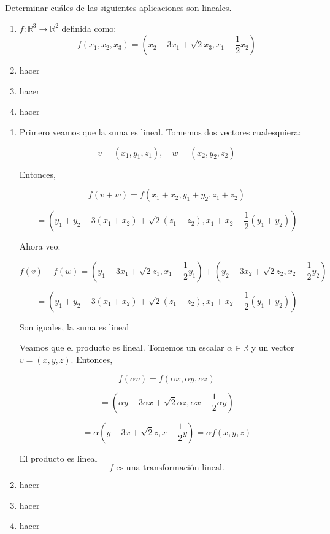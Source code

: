 \begin{enunciado}{\ejercicio}
  Determinar cuáles de las siguientes aplicaciones son lineales.
  \begin{enumerate}[label=(\alph*)]
  \item $f: \mathbb{R}^3 \to \mathbb{R}^2$ definida como:   \[
    f(x_1, x_2, x_3) = (x_2 - 3x_1 + \sqrt{2}x_3, x_1 - \frac{1}{2} x_2)
    \]
  \item hacer
  \item hacer
  \item hacer

  \end{enumerate}
\end{enunciado}

\begin{enumerate}[label=(\alph*)]
  \item
  Primero veamos que la suma es lineal. Tomemos dos vectores cualesquiera: 
  
  \[
  v = (x_1, y_1, z_1), \quad w = (x_2, y_2, z_2)
  \]
  
  Entonces,
  
  \[
  f(v + w) = f(x_1 + x_2, y_1 + y_2, z_1 + z_2)
  \]
  
  \[
  = (y_1 + y_2 - 3(x_1 + x_2) + \sqrt{2} (z_1 + z_2), x_1 + x_2 - \frac{1}{2} (y_1 + y_2))
  \]
  
  Ahora veo:
  
  \[
  f(v) + f(w) = (y_1 - 3x_1 + \sqrt{2} z_1, x_1 - \frac{1}{2} y_1) + (y_2 - 3x_2 + \sqrt{2} z_2, x_2 - \frac{1}{2} y_2)
  \]
  
  \[
  = (y_1 + y_2 - 3(x_1 + x_2) + \sqrt{2} (z_1 + z_2), x_1 + x_2 - \frac{1}{2} (y_1 + y_2))
  \]
  
  Son iguales, la suma es lineal
  
  Veamos que el producto es lineal. Tomemos un escalar $\alpha \in \mathbb{R}$ y un vector $v = (x, y, z)$. Entonces,
  
  \[
  f(\alpha v) = f(\alpha x, \alpha y, \alpha z)
  \]
  
  \[
  = (\alpha y - 3\alpha x + \sqrt{2} \alpha z, \alpha x - \frac{1}{2} \alpha y)
  \]
  
  \[
  = \alpha (y - 3x + \sqrt{2}z, x - \frac{1}{2} y) = \alpha f(x, y, z)
  \]
  
  El producto es lineal
  \[
  f \text{ es una transformación lineal.}
  \]
  \item hacer
  \item hacer
  \item hacer

\end{enumerate}

\begin{aportes}
  \item {} 
\end{aportes}